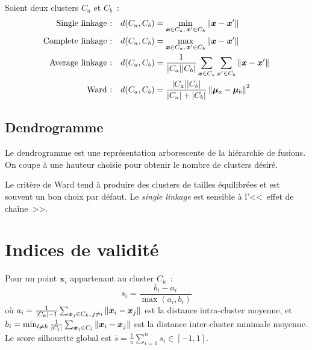 \begin{formules}[title=\textbf{Crit\`eres de liaison}]
Soient deux clusters $C_a$ et $C_b$~:
\begin{align}
  \text{Single linkage~:} \quad & d(C_a, C_b) = \min_{\bm{x} \in C_a,\,
    \bm{x}' \in C_b} \left\| \bm{x} - \bm{x}' \right\| \\
  \text{Complete linkage~:} \quad & d(C_a, C_b) = \max_{\bm{x} \in C_a,\,
    \bm{x}' \in C_b} \left\| \bm{x} - \bm{x}' \right\| \\
  \text{Average linkage~:} \quad & d(C_a, C_b) = \frac{1}{|C_a||C_b|}
    \sum_{\bm{x} \in C_a} \sum_{\bm{x}' \in C_b} \left\| \bm{x} - \bm{x}' \right\| \\
  \text{Ward~:} \quad & d(C_a, C_b) = \frac{|C_a||C_b|}{|C_a|+|C_b|}
    \left\| \bm{\mu}_a - \bm{\mu}_b \right\|^2
\end{align}
\end{formules}

\subsection{Dendrogramme}

Le dendrogramme est une repr\'esentation arborescente de la hi\'erarchie de
fusions. On coupe \`a une hauteur choisie pour obtenir le nombre de clusters
d\'esir\'e.

\begin{remarque}
Le crit\`ere de Ward tend \`a produire des clusters de tailles \'equilibr\'ees
et est souvent un bon choix par d\'efaut. Le \emph{single linkage} est sensible
\`a l'<<~effet de cha\^ine~>>.
\end{remarque}

\section{Indices de validit\'e}
\label{sec:indices}

\begin{definition}
Pour un point $\bm{x}_i$ appartenant au cluster $C_k$~:
\begin{equation}
  s_i = \frac{b_i - a_i}{\max(a_i, b_i)}
\end{equation}
o\`u $a_i = \frac{1}{|C_k|-1}\sum_{\bm{x}_j \in C_k,\, j \neq i}
\left\| \bm{x}_i - \bm{x}_j \right\|$ est la distance intra-cluster moyenne, et
$b_i = \min_{l \neq k} \frac{1}{|C_l|}\sum_{\bm{x}_j \in C_l}
\left\| \bm{x}_i - \bm{x}_j \right\|$ est la distance inter-cluster minimale moyenne.
Le score silhouette global est $\bar{s} = \frac{1}{n}\sum_{i=1}^n s_i
\in [-1, 1]$.
\end{definition}


